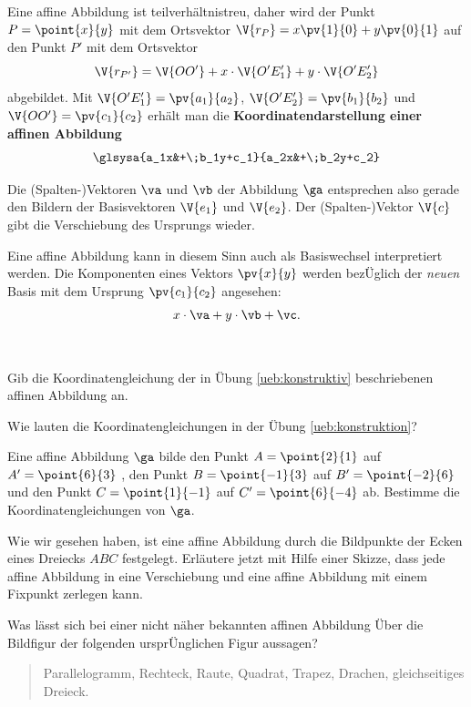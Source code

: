 \documentclass[%
11pt,%
twoside,%
titlepage,%
german,%
headsepline%
]{scrartcl}
\begin{document}
Eine affine Abbildung ist teilverhältnistreu, daher wird der Punkt $P = \point{x}{y}$ mit dem Ortsvektor $\V{r_P}=x\pv{1}{0}+y\pv{0}{1}$ auf den Punkt $P'$ mit dem Ortsvektor
$$\V{r_{P'}}=\V{OO'}+x\cdot\V{O'E'_1}+y\cdot\V{O'E'_2}$$
abgebildet. Mit $\V{O'E'_1}=\pv{a_1}{a_2}$, $\V{O'E'_2}=\pv{b_1}{b_2}$ und $\V{OO'}=\pv{c_1}{c_2}$ erhält man die \textbf{Koordinatendarstellung einer affinen Abbildung}
$$\glsysa{a_1x&+\;b_1y+c_1}{a_2x&+\;b_2y+c_2}$$

\begin{bem}
Die (Spalten-)Vektoren $\va$ und $\vb$ der Abbildung $\ga$ entsprechen also gerade den Bildern der Basisvektoren $\V{e_1}$ und $\V{e_2}$. Der (Spalten-)Vektor $\V{c}$ gibt die Verschiebung des Ursprungs wieder.
\end{bem}

\begin{bem}
Eine affine Abbildung kann in diesem Sinn auch als Basiswechsel interpretiert werden. Die Komponenten eines Vektors $\pv{x}{y}$ werden bez\"Uglich der \emph{neuen} Basis mit dem Ursprung $\pv{c_1}{c_2}$ angesehen:
$$x\cdot\va+y\cdot\vb+\vc.$$
\end{bem}

\begin{ueb}
\ \\[-4ex]
\begin{enumeratea}
\item Gib die Koordinatengleichung der in \"Ubung \ref{ueb:konstruktiv} beschriebenen affinen Abbildung an.
\item Wie lauten die Koordinatengleichungen in der \"Ubung \ref{ueb:konstruktion}?
\item Eine affine Abbildung $\ga$ bilde den Punkt $A = \point{2}{1}$ auf $A'= \point{6}{3}$ , den Punkt $B=\point{-1}{3}$ auf $B'=\point{-2}{6}$ und den Punkt $C=\point{1}{-1}$ auf $C'=\point{6}{-4}$ ab. Bestimme die Koordinatengleichungen von $\ga$.
\item Wie wir gesehen haben, ist eine affine Abbildung durch die Bildpunkte der Ecken eines Dreiecks $ABC$ festgelegt. Erläutere jetzt mit Hilfe einer Skizze, dass jede affine Abbildung in eine Verschiebung und eine affine Abbildung mit einem Fixpunkt zerlegen kann.
\end{enumeratea}
\end{ueb}

\begin{ueb}
Was lässt sich bei einer nicht näher bekannten affinen Abbildung \"Uber die Bildfigur der folgenden urspr\"Unglichen Figur aussagen?
\begin{quote}
Parallelogramm, Rechteck, Raute, Quadrat, Trapez, Drachen, gleichseitiges Dreieck.
\end{quote}
\end{ueb}
\end{document}
